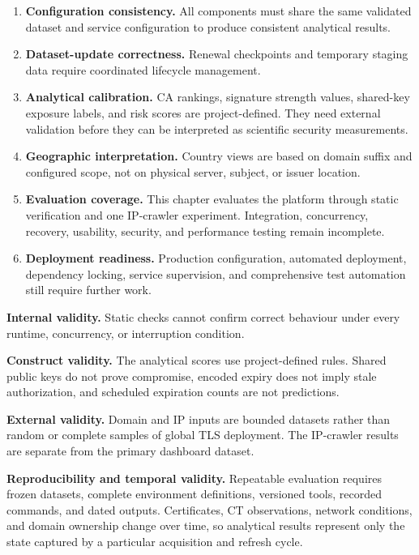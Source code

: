 \begin{enumerate}[label=\arabic*.,leftmargin=0.42in]
  \item \textbf{Configuration consistency.} All components must share the same validated dataset and service configuration to produce consistent analytical results.
  \item \textbf{Dataset-update correctness.} Renewal checkpoints and temporary staging data require coordinated lifecycle management.
  \item \textbf{Analytical calibration.} CA rankings, signature strength values, shared-key exposure labels, and risk scores are project-defined. They need external validation before they can be interpreted as scientific security measurements.
  \item \textbf{Geographic interpretation.} Country views are based on domain suffix and configured scope, not on physical server, subject, or issuer location.
  \item \textbf{Evaluation coverage.} This chapter evaluates the platform through static verification and one IP-crawler experiment. Integration, concurrency, recovery, usability, security, and performance testing remain incomplete.
  \item \textbf{Deployment readiness.} Production configuration, automated deployment, dependency locking, service supervision, and comprehensive test automation still require further work.
\end{enumerate}

\noindent\textbf{Internal validity.}
Static checks cannot confirm correct behaviour under every runtime, concurrency,
or interruption condition.

\noindent\textbf{Construct validity.}
The analytical scores use project-defined rules. Shared public keys do not prove
compromise, encoded expiry does not imply stale authorization, and scheduled
expiration counts are not predictions.

\noindent\textbf{External validity.}
Domain and IP inputs are bounded datasets rather than random or complete samples
of global TLS deployment. The IP-crawler results are separate from the primary
dashboard dataset.

\noindent\textbf{Reproducibility and temporal validity.}
Repeatable evaluation requires frozen datasets, complete environment
definitions, versioned tools, recorded commands, and dated outputs.
Certificates, CT observations, network conditions, and domain ownership change
over time, so analytical results represent only the state captured by a
particular acquisition and refresh cycle.
